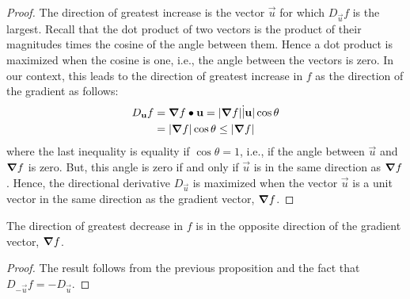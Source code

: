 \documentclass[handout]{ximera}
\begin{document}
\begin{proof}
The direction of greatest increase is the vector $\vec u$ for which $D_{\vec u}f$ is the largest. 
Recall that the dot product of two vectors is the product of their magnitudes times the cosine of the angle between them.  
Hence a dot product is maximized when the cosine is one, i.e., the angle between the vectors is zero.  In our context, this leads to the direction of greatest
increase in $f$ as the direction of the gradient as follows:
\begin{align*}
D_{\mathbf u} f &= \boldsymbol\nabla f \bullet \mathbf u = |\boldsymbol\nabla f| \dot |\mathbf u| \cos \theta\\
             &= |\boldsymbol\nabla f| \cos \theta \leq |\boldsymbol\nabla f|
\end{align*}
where the last inequality is equality if $\cos \theta = 1$, i.e., if the angle between $\vec u$ and $\boldsymbol\nabla f$ is zero.
But, this angle is zero if and only if $\vec u$ is in the same direction as $\boldsymbol\nabla f$.  Hence, the directional derivative
$D_{\vec u}$ is maximized when the vector $\vec u$ is a unit vector in the same direction as the gradient vector, $\boldsymbol\nabla f$.
\end{proof}

\begin{corollary}
The direction of greatest decrease in $f$ is in the opposite direction of the gradient vector, $\boldsymbol\nabla f$.
\end{corollary}
\begin{proof}
The result follows from the previous proposition and the fact that $D_{-\vec u} f = -D_{\vec u}$.
\end{proof}
\end{document}
